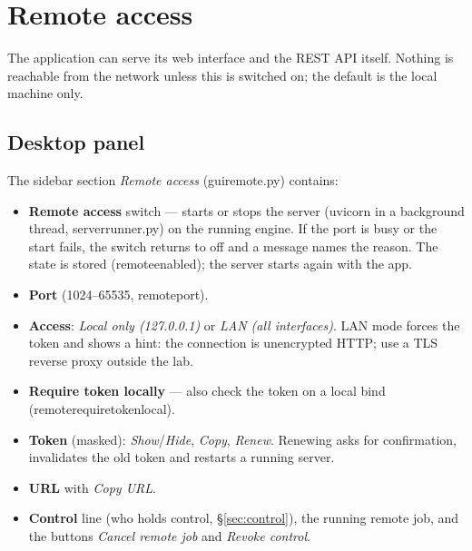 \documentclass[12pt,a4paper]{article}
\DeclareRobustCommand{\file}[1]{{\ttfamily\small\def\_{\rawus\allowbreak}#1}}
\DeclareRobustCommand{\key}[1]{{\ttfamily\small\color{acc2}\def\_{\rawus\allowbreak}#1}}
\begin{document}
\section{Remote access}\label{sec:remote}
The application can serve its web interface and the REST API itself. Nothing is
reachable from the network unless this is switched on; the default is the local
machine only.

\subsection{Desktop panel}
The sidebar section \emph{Remote access} (\file{gui\_remote.py}) contains:
\begin{itemize}
  \item \textbf{Remote access} switch --- starts or stops the server (uvicorn in a
        background thread, \file{server\_runner.py}) on the running engine. If the
        port is busy or the start fails, the switch returns to off and a message
        names the reason. The state is stored (\key{remote\_enabled}); the server
        starts again with the app.
  \item \textbf{Port} (1024--65535, \key{remote\_port}).
  \item \textbf{Access}: \emph{Local only (127.0.0.1)} or \emph{LAN (all
        interfaces)}. LAN mode forces the token and shows a hint: the connection
        is unencrypted HTTP; use a TLS reverse proxy outside the lab.
  \item \textbf{Require token locally} --- also check the token on a local bind
        (\key{remote\_require\_token\_local}).
  \item \textbf{Token} (masked): \emph{Show}\slash\emph{Hide}, \emph{Copy},
        \emph{Renew}. Renewing asks for confirmation, invalidates the old token and
        restarts a running server.
  \item \textbf{URL} with \emph{Copy URL}.
  \item \textbf{Control} line (who holds control, \S\ref{sec:control}), the running
        remote job, and the buttons \emph{Cancel remote job} and
        \emph{Revoke control}.
\end{itemize}
\end{document}
